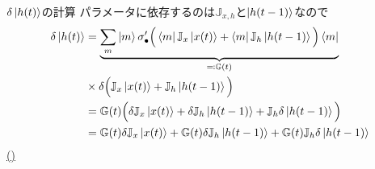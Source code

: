 \documentclass[dvipdfmx,10pt]{beamer}
\begin{document}
  \begin{frame}[label=計算1]{$\delta\ket{h(t)}$の計算}
    パラメータに依存するのは$\mathbb{J}_{x,h}$と$\ket{h(t-1)}$なので
    \begin{align*}
      \delta \ket{h(t)} &= \underbrace{\sum_{m}\ket{m}\sigma'_{\bullet}\Big(\bra{m}\mathbb{J}_{x}\ket{x(t)} + \bra{m}\mathbb{J}_{h}\ket{h(t-1)}\Big)\bra{m}}_{\eqcolon \mathbb{G}(t)}\\
      &\times \delta \Big(\mathbb{J}_x\ket{x(t)} + \mathbb{J}_{h}\ket{h(t-1)}\Big)\\
      &= \mathbb{G}(t)\Big( \delta \mathbb{J}_x \ket{x(t)} + \delta \mathbb{J}_{h}\ket{h(t-1)} + \mathbb{J}_{h}\delta\ket{h(t-1)} \Big)\\
      &= \mathbb{G}(t)\delta \mathbb{J}_x \ket{x(t)} + \mathbb{G}(t)\delta\mathbb{J}_h\ket{h(t-1)} + \mathbb{G}(t)\mathbb{J}_h \delta \ket{h(t-1)}
    \end{align*}
    \hyperlink{back}{()}
  \end{frame}
\end{document}

